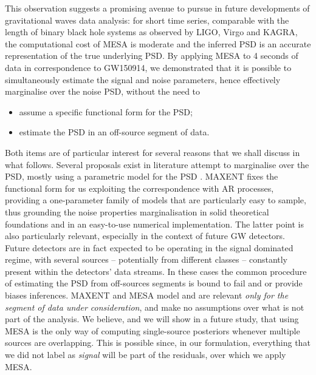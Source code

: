 \documentclass{aa}
\begin{document}
This observation suggests a promising avenue to pursue in future developments of gravitational waves data analysis: for short time series, comparable with the length of binary black hole systems as observed by LIGO, Virgo and KAGRA, the computational cost of MESA is moderate and the inferred PSD is an accurate representation of the true underlying PSD. By applying MESA to 4 seconds of data in correspondence to GW150914, we demonstrated that it is possible to simultaneously estimate the signal and noise parameters, hence effectively marginalise over the noise PSD, without the need to 
\begin{itemize}
\item assume a specific functional form for the PSD;
\item estimate the PSD in an off-source segment of data.
\end{itemize}
Both items are of particular interest for several reasons that we shall discuss in what follows. Several proposals exist in literature attempt to marginalise over the PSD, mostly using a parametric model for the PSD \citep{Littenberg_2013, Edwards_2015, lalinference}. MAXENT fixes the functional form for us exploiting the correspondence with AR processes, providing a one-parameter family of models that are particularly easy to sample, thus grounding the noise properties marginalisation in solid theoretical foundations and in an easy-to-use numerical implementation. The latter point is also particularly relevant, especially in the context of future GW detectors. Future detectors are in fact expected to be operating in the signal dominated regime, with several sources -- potentially from different classes -- constantly present within the detectors' data streams. In these cases the common procedure of estimating the PSD from off-sources segments is bound to fail and or provide biases inferences. MAXENT and MESA model and are relevant \emph{only for the segment of data under consideration}, and make no assumptions over what is not part of the analysis. We believe, and we will show in a future study, that using MESA is the only way of computing single-source posteriors whenever multiple sources are overlapping. This is possible since, in our formulation, everything that we did not label as \emph{signal} will be part of the residuals, over which we apply MESA. 
\end{document}
